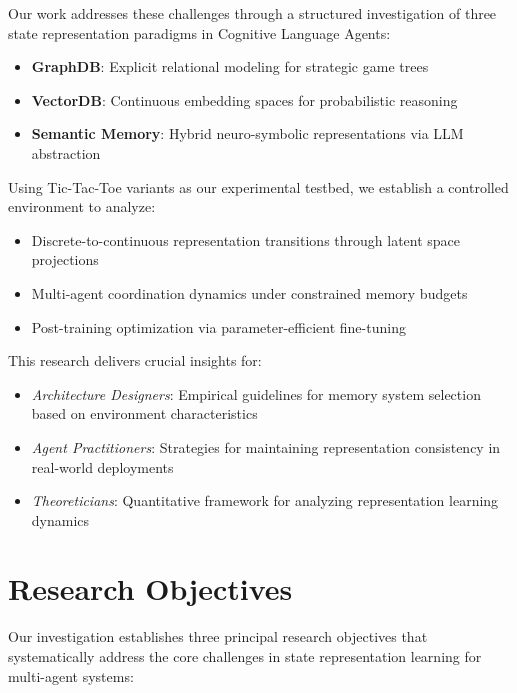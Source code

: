 \documentclass[11pt]{article}
\begin{document}
Our work addresses these challenges through a structured investigation of three state representation paradigms in Cognitive Language Agents:

\begin{itemize}
    \item \textbf{GraphDB}: Explicit relational modeling for strategic game trees
    \item \textbf{VectorDB}: Continuous embedding spaces for probabilistic reasoning
    \item \textbf{Semantic Memory}: Hybrid neuro-symbolic representations via LLM abstraction
\end{itemize}

Using Tic-Tac-Toe variants as our experimental testbed, we establish a controlled environment to analyze:

\begin{itemize}
    \item Discrete-to-continuous representation transitions through latent space projections
    \item Multi-agent coordination dynamics under constrained memory budgets
    \item Post-training optimization via parameter-efficient fine-tuning
\end{itemize}

This research delivers crucial insights for:
\begin{itemize}
    \item \textit{Architecture Designers}: Empirical guidelines for memory system selection based on environment characteristics
    \item \textit{Agent Practitioners}: Strategies for maintaining representation consistency in real-world deployments
    \item \textit{Theoreticians}: Quantitative framework for analyzing representation learning dynamics
\end{itemize}

\section{Research Objectives}
Our investigation establishes three principal research objectives that systematically address the core challenges in state representation learning for multi-agent systems:
\end{document}
